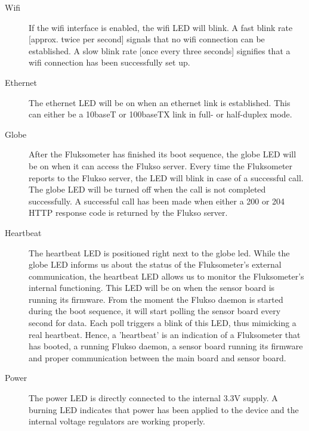 \begin{description}

\item[Wifi] If the wifi interface is enabled, the wifi LED will blink. A fast blink rate [approx. twice per second] signals that no wifi connection can be established. A slow blink rate [once every three seconds] signifies that a wifi connection has been successfully set up.

\item[Ethernet]	The ethernet LED will be on when an ethernet link is established. This can either be a 10baseT or 100baseTX link in full- or half-duplex mode.

\item[Globe] After the Fluksometer has finished its boot sequence, the globe LED will be on when it can access the Flukso server. Every time the Fluksometer reports to the Flukso server, the LED will blink in case of a successful call. The globe LED will be turned off when the call is not completed successfully. A successful call has been made when either a 200 or 204 HTTP response code is returned by the Flukso server.

\item[Heartbeat] The heartbeat LED is positioned right next to the globe led. While the globe LED informs us about the status of the Fluksometer's external communication, the heartbeat LED allows us to monitor the Fluksometer's internal functioning. This LED will be on when the sensor board is running its firmware. From the moment the Flukso daemon is started during the boot sequence, it will start polling the sensor board every second for data. Each poll triggers a blink of this LED, thus mimicking a real heartbeat. Hence, a 'heartbeat' is an indication of a Fluksometer that has booted, a running Flukso daemon, a sensor board running its firmware and proper communication between the main board and sensor board.

\item[Power] The power LED is directly connected to the internal 3.3V supply. A burning LED indicates that power has been applied to the device and the internal voltage regulators are working properly.

\end{description}

